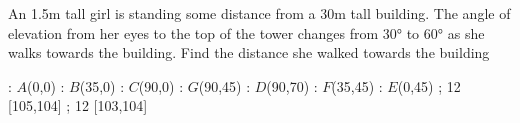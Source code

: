 
%
%
%
%
% 
% 
\question[3] An 1.5m tall girl is standing some distance from a 30m tall building.
The angle of elevation from her eyes to the top of the tower changes from $\ang{30}$
to $\ang{60}$ as she walks towards the building. Find the distance she walked towards the building


\ifprintanswers
  \begin{marginfigure}
      : $A$(0,0)
      : $B$(35,0)
      : $C$(90,0)
      : $G$(90,45)
      : $D$(90,70)
      : $F$(35,45)
      : $E$(0,45)
    \figdrawbegin{}
      \figdrawline [100,101,102,103,105,106,100]
      \figdrawline [101,105,104,106]
      \figdrawline [103,104]
       ; 12 [105,104] 
       ; 12 [103,104] 
    \figdrawend
    \centerline{\box\figBoxA}
  \end{marginfigure}
\fi 

